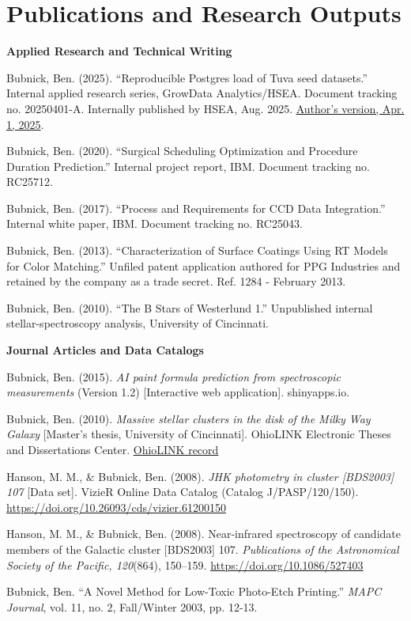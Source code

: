 \section{Publications and Research Outputs}
\begingroup
\raggedright

\textbf{Applied Research and Technical Writing}\par
Bubnick, Ben. (2025). ``Reproducible Postgres load of Tuva seed datasets.'' Internal applied research series, GrowData Analytics/HSEA. Document tracking no. 20250401-A. Internally published by HSEA, Aug. 2025. \href{https://github.com/bubnicbf/tuva-postgres/blob/dev/report.pdf}{Author's version, Apr. 1, 2025}.\par
Bubnick, Ben. (2020). ``Surgical Scheduling Optimization and Procedure Duration Prediction.'' Internal project report, IBM. Document tracking no. RC25712.\par
Bubnick, Ben. (2017). ``Process and Requirements for CCD Data Integration.'' Internal white paper, IBM. Document tracking no. RC25043.\par
Bubnick, Ben. (2013). ``Characterization of Surface Coatings Using RT Models for Color Matching.'' Unfiled patent application authored for PPG Industries and retained by the company as a trade secret. Ref. 1284 - February 2013.\par
Bubnick, Ben. (2010). ``The B Stars of Westerlund 1.'' Unpublished internal stellar-spectroscopy analysis, University of Cincinnati.

\smallskip
\textbf{Journal Articles and Data Catalogs}\par
Bubnick, Ben. (2015). \textit{AI paint formula prediction from spectroscopic measurements} (Version 1.2) [Interactive web application]. shinyapps.io.\par
Bubnick, Ben. (2010). \textit{Massive stellar clusters in the disk of the Milky Way Galaxy} [Master's thesis, University of Cincinnati]. OhioLINK Electronic Theses and Dissertations Center. \href{https://etd.ohiolink.edu/acprod/odb_etd/ws/send_file/send?accession=ucin1288378106\&disposition=inline}{OhioLINK record}\par
Hanson, M. M., \& Bubnick, Ben. (2008). \textit{JHK photometry in cluster [BDS2003] 107} [Data set]. VizieR Online Data Catalog (Catalog J/PASP/120/150). \url{https://doi.org/10.26093/cds/vizier.61200150}\par
Hanson, M. M., \& Bubnick, Ben. (2008). Near-infrared spectroscopy of candidate members of the Galactic cluster [BDS2003] 107. \textit{Publications of the Astronomical Society of the Pacific, 120}(864), 150--159. \linebreak\mbox{\href{https://doi.org/10.1086/527403}{https://doi.org/10.1086/527403}}\par
Bubnick, Ben. ``A Novel Method for Low-Toxic Photo-Etch Printing.'' \textit{MAPC Journal}, vol. 11, no. 2, Fall/Winter 2003, pp. 12-13.
\par
\endgroup
